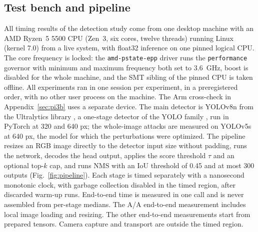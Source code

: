 \documentclass[a4paper,fleqn]{cas-dc}
\begin{document}
\subsection{Test bench and pipeline}
All timing results of the detection study come from one desktop machine with an AMD Ryzen~5 5500 CPU (Zen~3, six cores, twelve threads) running Linux (kernel 7.0) from a live system, with float32 inference on one pinned logical CPU. The core frequency is locked: the \texttt{amd-pstate-epp} driver runs the \texttt{performance} governor with minimum and maximum frequency both set to 3.6~GHz, boost is disabled for the whole machine, and the SMT sibling of the pinned CPU is taken offline. All experiments ran in one session per experiment, in a preregistered order, with no other user process on the machine. The Arm cross-check in Appendix~\ref{sec:pi3b} uses a separate device. The main detector is YOLOv8n from the Ultralytics library \cite{ultralytics2023}, a one-stage detector of the YOLO family \cite{redmon2016yolo}, run in PyTorch \cite{paszke2019pytorch} at 320 and 640 px; the whole-image attacks are measured on YOLOv5s at 640 px, the model for which the perturbations were optimized. The pipeline resizes an RGB image directly to the detector input size without padding, runs the network, decodes the head output, applies the score threshold $\tau$ and an optional top-$k$ cap, and runs NMS with an IoU threshold of 0.45 and at most 300 outputs (Fig.~\ref{fig:pipeline}). Each stage is timed separately with a nanosecond monotonic clock, with garbage collection disabled in the timed region, after discarded warm-up runs. End-to-end time is measured in one call and is never assembled from per-stage medians. The A/A end-to-end measurement includes local image loading and resizing. The other end-to-end measurements start from prepared tensors. Camera capture and transport are outside the timed region.
\end{document}
